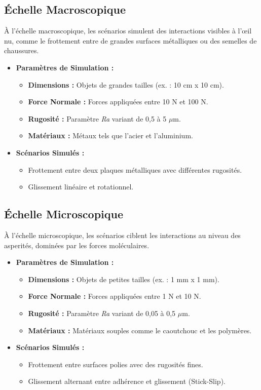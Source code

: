 \subsection{Échelle Macroscopique}
À l'échelle macroscopique, les scénarios simulent des interactions visibles à l'œil nu, comme le frottement entre de grandes surfaces métalliques ou des semelles de chaussures.
\begin{itemize}
    \item \textbf{Paramètres de Simulation :}
    \begin{itemize}
        \item \textbf{Dimensions :} Objets de grandes tailles (ex. : 10 cm x 10 cm).
        \item \textbf{Force Normale :} Forces appliquées entre 10 N et 100 N.
        \item \textbf{Rugosité :} Paramètre \textit{Ra} variant de 0,5 à 5 $\mu$m.
        \item \textbf{Matériaux :} Métaux tels que l'acier et l'aluminium.
    \end{itemize}
    \item \textbf{Scénarios Simulés :}
    \begin{itemize}
        \item Frottement entre deux plaques métalliques avec différentes rugosités.
        \item Glissement linéaire et rotationnel.
    \end{itemize}
\end{itemize}

\subsection{Échelle Microscopique}
À l'échelle microscopique, les scénarios ciblent les interactions au niveau des asperités, dominées par les forces moléculaires.
\begin{itemize}
    \item \textbf{Paramètres de Simulation :}
    \begin{itemize}
        \item \textbf{Dimensions :} Objets de petites tailles (ex. : 1 mm x 1 mm).
        \item \textbf{Force Normale :} Forces appliquées entre 1 N et 10 N.
        \item \textbf{Rugosité :} Paramètre \textit{Ra} variant de 0,05 à 0,5 $\mu$m.
        \item \textbf{Matériaux :} Matériaux souples comme le caoutchouc et les polymères.
    \end{itemize}
    \item \textbf{Scénarios Simulés :}
    \begin{itemize}
        \item Frottement entre surfaces polies avec des rugosités fines.
        \item Glissement alternant entre adhérence et glissement (Stick-Slip).
    \end{itemize}
\end{itemize}

